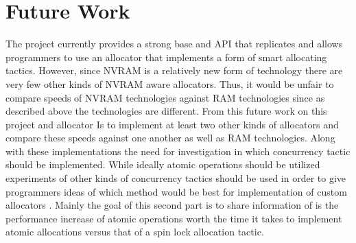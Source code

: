 \documentclass[conference]{IEEEtran}
\begin{document}
\section{Future Work}
The project currently provides a strong base and API that replicates and allows programmers to use an allocator that implements a form of smart allocating tactics. However, since NVRAM is a relatively new form of technology there are very few other kinds of NVRAM aware allocators. Thus, it would be unfair to compare speeds of NVRAM technologies against RAM technologies since as described above the technologies are different. From this future work on this project and allocator Is to implement at least two other kinds of allocators and compare these speeds against one another as well as RAM technologies. Along with these implementations the need for investigation in which concurrency tactic should be implemented. While ideally atomic operations should be utilized experiments of other kinds of concurrency tactics should be used in order to give programmers ideas of which method would be best for implementation of custom allocators \cite{Arulrajdbms}. Mainly the goal of this second part is to share information of is the performance increase of atomic operations worth the time it takes to implement atomic allocations versus that of a spin lock allocation tactic. 
\end{document}
